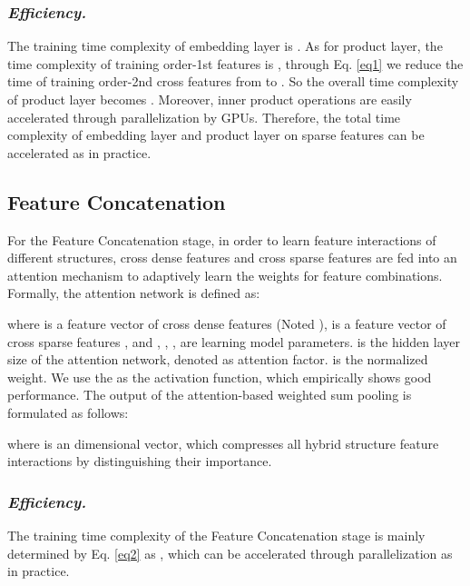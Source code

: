 \documentclass[letterpaper]{article} \usepackage{aaai21}  \usepackage{times}  \usepackage{helvet} \usepackage{courier}  \usepackage[hyphens]{url}  \usepackage{graphicx} \urlstyle{rm} \def\UrlFont{\rm}  \usepackage{natbib}  \usepackage{caption} \frenchspacing  \setlength{\pdfpagewidth}{8.5in}  \setlength{\pdfpageheight}{11in}  \usepackage{graphicx}
\begin{document}
\vspace{-0.1cm}
\subsubsection{{\em Efficiency.}} The training time complexity of embedding layer is . As for product layer, the time complexity of training order-1st features is , through Eq. \ref{eq1} we reduce the time of training order-2nd cross features from  to . So the overall time complexity of product layer becomes .  Moreover, inner product operations are easily accelerated through parallelization by GPUs. Therefore, the total time complexity of embedding layer and product layer on sparse features can be accelerated as  in practice.

\vspace{-0.1cm}
\subsection{Feature Concatenation}
For the Feature Concatenation stage, in order to learn feature interactions of different structures, cross dense features  and cross sparse features  are fed into an attention mechanism to adaptively learn the weights for feature combinations. Formally, the attention network is defined as:
\begin{small}
	
\end{small}where  is a feature vector of cross dense features  (Noted ),  is a feature vector of cross sparse features , and , , ,  are learning model parameters.  is the hidden layer size of the attention network, denoted as attention factor.  is the normalized weight. We use the  as the activation function, which empirically shows good performance. The output of the attention-based weighted sum pooling is formulated as follows:
\begin{small}
	
\end{small}where  is an  dimensional vector, which compresses all hybrid structure feature interactions by distinguishing their importance. 
\subsubsection{{\em Efficiency.}} The training time complexity of the Feature Concatenation stage is mainly  determined by Eq. \ref{eq2} as , which can be accelerated through parallelization as  in practice.

\vspace{-0.1cm}
\end{document}
